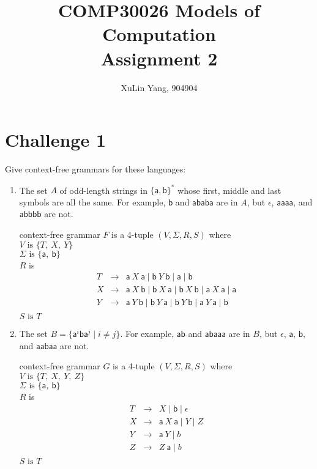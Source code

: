 \documentclass[11pt]{article}
\newcommand{\ma}{\mathsf{a}}
\newcommand{\mb}{\mathsf{b}}
\begin{document}
\author{XuLin Yang, 904904}
\title{COMP30026 Models of Computation \\ Assignment 2}
\maketitle

\medskip

\section*{Challenge 1}

Give context-free grammars for these languages:
\begin{enumerate}
\item
The set $A$ of odd-length strings in $\{\ma,\mb\}^*$ whose first, 
middle and last symbols are all the same.
For example, $\mb$ and $\ma \mb \ma \mb \ma$ are in $A$,
but $\epsilon$, $\ma \ma \ma \ma$, and $\ma \mb \mb \mb \mb$ are not.

context-free grammar $F$ is a 4-tuple $(V, \Sigma, R, S)$ where \\
$V \text{ is } \{ T,\ X,\ Y \}$ \\
$\Sigma \text{ is } \{ \ma,\ \mb \}$ \\
$R$ is 
\[
\begin{array}{lrl}
   T & \rightarrow & \ma\ X\ \ma \mid \mb\ Y\ \mb \mid \ma \mid \mb \\
   X & \rightarrow & \ma\ X\ \mb \mid \mb\ X\ \ma \mid \mb\ X\ \mb \mid \ma\ X\ \ma \mid \ma \\
   Y & \rightarrow & \ma\ Y\ \mb \mid \mb\ Y\ \ma \mid \mb\ Y\ \mb \mid \ma\ Y\ \ma \mid \mb \\
\end{array}
\]
$S \text{ is } T $

\item
The set $B = \{\ma^i \mb \ma^j \mid i \not= j\}$.
For example, $\ma \mb$ and $\ma \mb \ma \ma \ma$ are in $B$,
but $\epsilon$, $\ma$, $\mb$, and $\ma \ma \mb \ma \ma$ are not.

context-free grammar $G$ is a 4-tuple $(V, \Sigma, R, S)$ where \\
$V \text{ is } \{ T,\ X,\ Y,\ Z \}$ \\
$\Sigma \text{ is } \{ \ma,\ \mb \}$ \\
$R$ is 
\[
\begin{array}{lrl}
   T & \rightarrow & X \mid \mb \mid \epsilon \\
   X & \rightarrow & \ma\ X\ \ma \mid Y \mid Z \\
   Y & \rightarrow & \ma\ Y \mid b  \\
   Z & \rightarrow & Z\ \ma \mid b \\
\end{array}
\]
$S \text{ is } T $

\end{enumerate}
\end{document}

